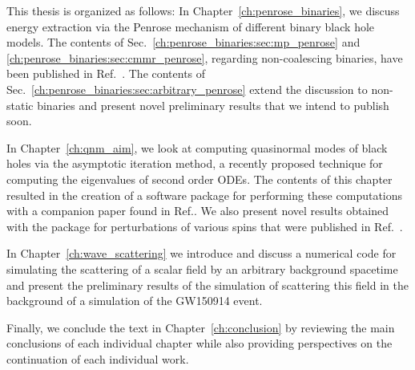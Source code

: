 This thesis is organized as follows: In Chapter~\ref{ch:penrose_binaries}, we discuss energy extraction via the Penrose mechanism of different binary black hole models. The contents of Sec.~\ref{ch:penrose_binaries:sec:mp_penrose} and \ref{ch:penrose_binaries:sec:cmmr_penrose}, regarding non-coalescing binaries, have been published in Ref.~\cite{PhysRevD.104.124025}. The contents of Sec.~\ref{ch:penrose_binaries:sec:arbitrary_penrose} extend the discussion to non-static binaries and present novel preliminary results that we intend to publish soon.

In Chapter~\ref{ch:qnm_aim}, we look at computing quasinormal modes of black holes via the asymptotic iteration method, a recently proposed technique for computing the eigenvalues of second order ODEs. The contents of this chapter resulted in the creation of a software package for performing these computations with a companion paper found in Ref.\cite{Sanches2022}. We also present novel results obtained with the package for perturbations of various spins that were published in Ref.~\cite{Mamani2022}.

In Chapter~\ref{ch:wave_scattering} we introduce and discuss a numerical code for simulating the scattering of a scalar field by an arbitrary background spacetime and present the preliminary results of the simulation of scattering this field in the background of a simulation of the GW150914 event.

Finally, we conclude the text in Chapter~\ref{ch:conclusion} by reviewing the main conclusions of each individual chapter while also providing perspectives on the continuation of each individual work.





